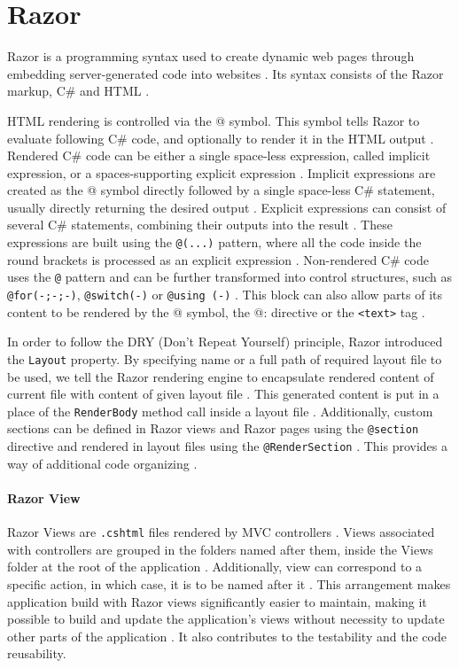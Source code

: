 \section{Razor}
Razor is a programming syntax used to create dynamic web pages through embedding server-generated code into websites \citep{microsoft.docs}. Its syntax consists of the Razor markup, C\# and HTML \citep{microsoft.docs}.

HTML rendering is controlled via the @ symbol. This symbol tells Razor to evaluate following C\# code, and optionally to render it in the HTML output \citep{microsoft.docs}. Rendered C\# code can be either a single space-less expression, called implicit expression, or a spaces-supporting explicit expression \citep{microsoft.docs}. Implicit expressions are created as the @ symbol directly followed by a single space-less C\# statement, usually directly returning the desired output \citep{microsoft.docs}. Explicit expressions can consist of several C\# statements, combining their outputs into the result \citep{microsoft.docs}. These expressions are built using the \texttt{@(...)} pattern, where all the code inside the round brackets is processed as an explicit expression \citep{microsoft.docs}. Non-rendered C\# code uses the \texttt{@} pattern and can be further transformed into control structures, such as \texttt{@for(-;-;-)}, \texttt{@switch(-)} or \texttt{@using (-)} \citep{microsoft.docs}. This block can also allow parts of its content to be rendered by the @ symbol, the @: directive or the \texttt{<text>} tag \citep{microsoft.docs}.

In order to follow the DRY (Don't Repeat Yourself) principle, Razor introduced the \texttt{Layout} property. By specifying name or a full path of required layout file to be used, we tell the Razor rendering engine to encapsulate rendered content of current file with content of given layout file \citep{microsoft.docs}. This generated content is put in a place of the \texttt{RenderBody} method call inside a layout file \citep{microsoft.docs}. Additionally, custom sections can be defined in Razor views and Razor pages using the \texttt{@section} directive and rendered in layout files using the \texttt{@RenderSection} \citep{microsoft.docs}. This provides a way of additional code organizing \citep{microsoft.docs}. 

\paragraph{Razor View}
Razor Views are \texttt{.cshtml} files rendered by MVC controllers \citep{microsoft.docs}. Views associated with controllers are grouped in the folders named after them, inside the Views folder at the root of the application \citep{microsoft.docs}. Additionally, view can correspond to a specific action, in which case, it is to be named after it \citep{microsoft.docs}. This arrangement makes application build with Razor views significantly easier to maintain, making it possible to build and update the application's views without necessity to update other parts of the application \citep{microsoft.docs}. It also contributes to the testability and the code reusability.

